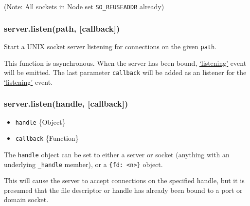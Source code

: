 \begin{Shaded}
\begin{Highlighting}[]
\NormalTok{(}\NormalTok{, } 
   \NormalTok{(} \NormalTok{== }\NormalTok{) \{}
    \NormalTok{(}\NormalTok{);}
     \NormalTok{() \{}
      \NormalTok{();}
    \NormalTok{\}, }\NormalTok{);}
  \NormalTok{\}}
\NormalTok{\});}
\end{Highlighting}
\end{Shaded}

(Note: All sockets in Node set \texttt{SO\_REUSEADDR} already)

\subsubsection{server.listen(path, {[}callback{]})}

Start a UNIX socket server listening for connections on the given
\texttt{path}.

This function is asynchronous. When the server has been bound,
\hyperref[net\_event\_listening]{`listening'} event will be emitted. The
last parameter \texttt{callback} will be added as an listener for the
\hyperref[net\_event\_listening]{`listening'} event.

\subsubsection{server.listen(handle, {[}callback{]})}

\begin{itemize}
\item
  \texttt{handle} \{Object\}
\item
  \texttt{callback} \{Function\}
\end{itemize}

The \texttt{handle} object can be set to either a server or socket
(anything with an underlying \texttt{\_handle} member), or a
\texttt{\{fd: \textless{}n\textgreater{}\}} object.

This will cause the server to accept connections on the specified
handle, but it is presumed that the file descriptor or handle has
already been bound to a port or domain socket.

